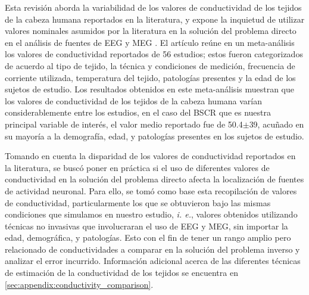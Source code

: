 Esta revisión aborda la variabilidad de los valores de conductividad de los tejidos de la cabeza humana reportados en la literatura, y expone la inquietud  de utilizar valores nominales asumidos por la literatura en la solución del problema directo en el análisis de fuentes de EEG y MEG \cite{McCann2019}. El artículo reúne en un meta-análisis los valores de conductividad reportados de 56 estudios; estos fueron categorizados de acuerdo al tipo de tejido, la técnica y condiciones de medición, frecuencia de corriente utilizada, temperatura del tejido, patologías presentes y la edad de los sujetos de estudio. Los resultados obtenidos en este meta-análisis muestran que los valores de conductividad de los tejidos de la cabeza humana varían considerablemente entre los estudios, en el caso del BSCR que es nuestra principal variable de interés, el valor medio reportado fue de 50.4$\mathbf{\pm}$39, acuñado en su mayoría a la demografía, edad, y patologías presentes en los sujetos de estudio.

Tomando en cuenta la disparidad de los valores de conductividad reportados en la literatura, se buscó poner en práctica si el uso de diferentes valores de conductividad en la solución del problema directo afecta la localización de fuentes de actividad neuronal. Para ello, se tomó como base esta recopilación de valores de conductividad, particularmente los que se obtuvieron bajo las mismas condiciones que simulamos en nuestro estudio, \emph{i. e.}, valores obtenidos utilizando técnicas no invasivas que involucraran el uso de EEG y MEG, sin importar la edad, demográfica, y patologías. Esto con el fin de tener un rango amplio pero relacionado de conductividades a comparar en la solución del problema inverso y analizar el error incurrido. Información adicional acerca de las diferentes técnicas de estimación de la conductividad de los tejidos se encuentra en \cref{sec:appendix:conductivity_comparison}.

